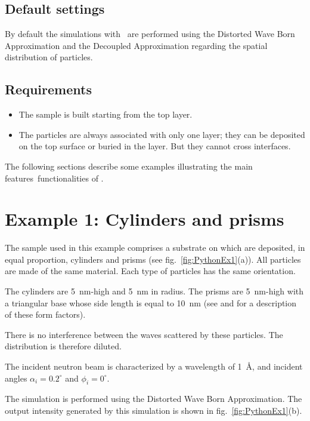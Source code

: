 \subsection{Default settings}
By default the simulations with \BornAgain\ are performed using the Distorted Wave Born Approximation and the Decoupled Approximation regarding the spatial distribution of particles.


\subsection{Requirements}
\begin{itemize}
  \item The sample is built starting from the top layer.
  \item The particles are always associated with only one layer; they can be deposited on the top surface or buried in the layer. But they cannot cross interfaces.
\end{itemize}
The following sections describe some examples illustrating the main features\ functionalities of \BornAgain .


\newpage
\section{Example 1: Cylinders and prisms}
The sample used in this example comprises a substrate on which are deposited, in equal proportion, cylinders and prisms (see fig.~\ref{fig:PythonEx1}(a)). All particles are made of the same material. Each type of particles has the same orientation.

The cylinders are 5~nm-high and 5~nm in radius. The prisms are 5~nm-high with a triangular base whose side length is equal to 10~nm (see  and  for a description of these form factors). 

There is no interference between the waves scattered by these particles. The distribution is therefore diluted.

The incident neutron beam is characterized by a wavelength of 1~\AA, and incident angles $\alpha_i=0.2^{\circ}$ and $\phi_i=0^{\circ}$.

The simulation is performed using the Distorted Wave Born Approximation. The output intensity generated by this simulation is shown in fig.~\ref{fig:PythonEx1}(b).


